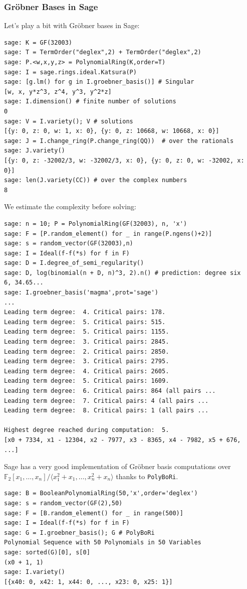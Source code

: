 \documentclass[9pt]{beamer}
\newcommand{\field}[1]{\ensuremath{\mathbb{#1}}}
\newcommand{\F}{\ensuremath{\field{F}}}
\begin{document}
\begin{frame}
\frametitle{Gröbner Bases in Sage}

Let's play a bit with Gröbner bases in Sage:

\begin{lstlisting}
sage: K = GF(32003)
sage: T = TermOrder("deglex",2) + TermOrder("deglex",2)
sage: P.<w,x,y,z> = PolynomialRing(K,order=T)
sage: I = sage.rings.ideal.Katsura(P)
sage: [g.lm() for g in I.groebner_basis()] # Singular
[w, x, y*z^3, z^4, y^3, y^2*z]
sage: I.dimension() # finite number of solutions
0
sage: V = I.variety(); V # solutions
[{y: 0, z: 0, w: 1, x: 0}, {y: 0, z: 10668, w: 10668, x: 0}]
sage: J = I.change_ring(P.change_ring(QQ))  # over the rationals
sage: J.variety()
[{y: 0, z: -32002/3, w: -32002/3, x: 0}, {y: 0, z: 0, w: -32002, x: 0}]
sage: len(J.variety(CC)) # over the complex numbers
8
\end{lstlisting}

\framebreak

We estimate the complexity before solving:

\begin{lstlisting}
sage: n = 10; P = PolynomialRing(GF(32003), n, 'x')
sage: F = [P.random_element() for _ in range(P.ngens()+2)]
sage: s = random_vector(GF(32003),n)
sage: I = Ideal(f-f(*s) for f in F)
sage: D = I.degree_of_semi_regularity()
sage: D, log(binomial(n + D, n)^3, 2).n() # prediction: degree six
6, 34.65...
sage: I.groebner_basis('magma',prot='sage')
...
Leading term degree:  4. Critical pairs: 178.
Leading term degree:  5. Critical pairs: 515.
Leading term degree:  5. Critical pairs: 1155.
Leading term degree:  3. Critical pairs: 2845.
Leading term degree:  2. Critical pairs: 2850.
Leading term degree:  3. Critical pairs: 2795.
Leading term degree:  4. Critical pairs: 2605.
Leading term degree:  5. Critical pairs: 1609.
Leading term degree:  6. Critical pairs: 864 (all pairs ...
Leading term degree:  7. Critical pairs: 4 (all pairs ...
Leading term degree:  8. Critical pairs: 1 (all pairs ...

Highest degree reached during computation:  5.
[x0 + 7334, x1 - 12304, x2 - 7977, x3 - 8365, x4 - 7982, x5 + 676, ...]
\end{lstlisting}

\framebreak

Sage has a very good implementation of Gröbner basis computations over $\F_2[x_1,\dots,x_{n}]/\langle x_1^2 + x_1, \dots, x_{n}^2 + x_{n}\rangle$ thanks to {\tt PolyBoRi}.

\begin{lstlisting}
sage: B = BooleanPolynomialRing(50,'x',order='deglex')
sage: s = random_vector(GF(2),50)
sage: F = [B.random_element() for _ in range(500)]
sage: I = Ideal(f-f(*s) for f in F)
sage: G = I.groebner_basis(); G # PolyBoRi
Polynomial Sequence with 50 Polynomials in 50 Variables
sage: sorted(G)[0], s[0]
(x0 + 1, 1)
sage: I.variety()
[{x40: 0, x42: 1, x44: 0, ..., x23: 0, x25: 1}]
\end{lstlisting}

\end{frame}
\end{document}
